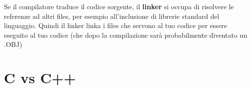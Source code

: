 \textsf{\small Se il compilatore traduce il codice sorgente, il \textbf{linker} si occupa di risolvere le referenze ad altri files, per esempio all'inclusione di librerie standard del linguaggio. Quindi il linker linka i files che servono al tuo codice per essere eseguito al tuo codice (che dopo la compilazione sarà probabilmente diventato un .OBJ)} \\



\newpage

\section{C vs C++}

